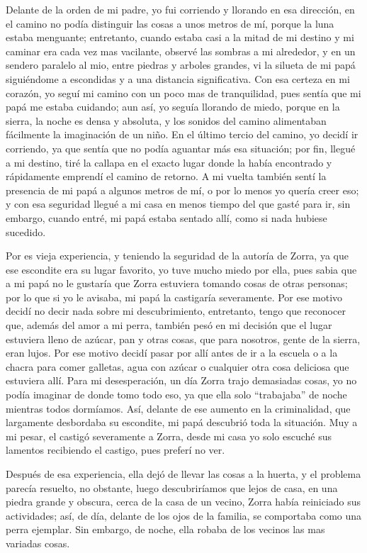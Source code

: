 Delante de la orden de mi padre, yo fui corriendo y llorando en esa dirección, en el camino no podía distinguir las cosas a unos metros de mí, porque la luna estaba menguante; entretanto, cuando estaba casi a la mitad de mi destino y mi caminar era cada vez mas vacilante, observé las sombras a mi alrededor, y en un sendero paralelo al mio, entre piedras y arboles grandes, vi la silueta de mi papá siguiéndome a escondidas y a una distancia significativa.
Con esa certeza en mi corazón, yo seguí mi camino con un poco mas de tranquilidad, pues sentía que mi papá me estaba cuidando; aun así, yo seguía llorando de miedo, porque en la sierra, la noche es densa y absoluta, y los sonidos del camino alimentaban fácilmente la imaginación de un niño.
En el último tercio del camino, yo decidí ir corriendo, ya que sentía que no podía aguantar más esa situación; por fin, llegué a mi destino, tiré la callapa en el exacto lugar donde la había encontrado y rápidamente emprendí el camino de retorno.
A mi vuelta también sentí la presencia de mi papá a algunos metros de mí, o por lo menos yo quería creer eso; y con esa seguridad llegué a mi casa en menos tiempo del que gasté para ir, sin embargo, cuando entré, mi papá estaba sentado allí, como si nada hubiese sucedido.

Por es vieja experiencia, y teniendo la seguridad de la autoría de Zorra, ya que ese escondite era su lugar favorito, yo tuve mucho miedo por ella, pues sabia que a mi papá no le gustaría que Zorra estuviera tomando cosas de otras personas; por lo que si yo le avisaba, mi papá la castigaría severamente. Por ese motivo decidí no decir nada sobre mi descubrimiento, entretanto, tengo que reconocer que, además del amor a mi perra, también pesó en mi decisión que el lugar estuviera lleno de azúcar, pan y otras cosas, que para nosotros, gente de la sierra, eran lujos.
Por ese motivo decidí pasar por allí antes de ir a la escuela o a la chacra para comer galletas, agua con azúcar o cualquier otra cosa deliciosa que estuviera allí.
Para mi desesperación, un día Zorra trajo demasiadas cosas, yo no podía imaginar de donde tomo todo eso, ya que ella solo ``trabajaba'' de noche mientras todos dormíamos. Así, delante de ese aumento en la criminalidad, que largamente desbordaba su escondite, mi papá descubrió toda la situación.
Muy a mi pesar, el castigó severamente a Zorra, desde mi casa yo solo escuché sus lamentos recibiendo el castigo, pues preferí no ver.


Después de esa experiencia, ella dejó de llevar las cosas a la huerta, y el problema parecía resuelto, no obstante, luego descubriríamos que lejos de casa, en una piedra grande y obscura, cerca de la casa de un vecino, 
Zorra había reiniciado sus actividades; así, de día, delante de los ojos de la familia, se comportaba como una perra ejemplar. Sin embargo, de noche, ella robaba de los vecinos las mas variadas cosas.


